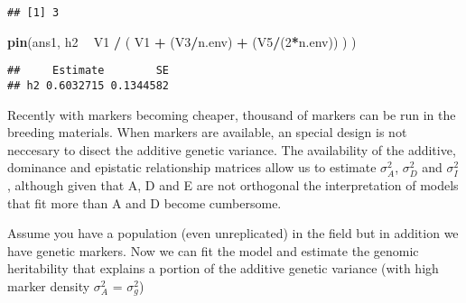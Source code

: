 \documentclass[]{article}
\newenvironment{Shaded}{\begin{snugshade}}{\end{snugshade}}
\newcommand{\KeywordTok}[1]{\textcolor[rgb]{0.13,0.29,0.53}{\textbf{#1}}}
\newcommand{\DataTypeTok}[1]{\textcolor[rgb]{0.13,0.29,0.53}{#1}}
\newcommand{\DecValTok}[1]{\textcolor[rgb]{0.00,0.00,0.81}{#1}}
\newcommand{\StringTok}[1]{\textcolor[rgb]{0.31,0.60,0.02}{#1}}
\newcommand{\CommentTok}[1]{\textcolor[rgb]{0.56,0.35,0.01}{\textit{#1}}}
\newcommand{\OperatorTok}[1]{\textcolor[rgb]{0.81,0.36,0.00}{\textbf{#1}}}
\newcommand{\NormalTok}[1]{#1}
\begin{document}
\begin{verbatim}
## [1] 3
\end{verbatim}

\begin{Shaded}
\begin{Highlighting}[]
\KeywordTok{pin}\NormalTok{(ans1, h2 }\OperatorTok{~}\StringTok{ }\NormalTok{V1 }\OperatorTok{/}\StringTok{ }\NormalTok{( V1 }\OperatorTok{+}\StringTok{ }\NormalTok{(V3}\OperatorTok{/}\NormalTok{n.env) }\OperatorTok{+}\StringTok{ }\NormalTok{(V5}\OperatorTok{/}\NormalTok{(}\DecValTok{2}\OperatorTok{*}\NormalTok{n.env)) ) )}
\end{Highlighting}
\end{Shaded}

\begin{verbatim}
##     Estimate        SE
## h2 0.6032715 0.1344582
\end{verbatim}

Recently with markers becoming cheaper, thousand of markers can be run
in the breeding materials. When markers are available, an special design
is not neccesary to disect the additive genetic variance. The
availability of the additive, dominance and epistatic relationship
matrices allow us to estimate \(\sigma^2_A\), \(\sigma^2_D\) and
\(\sigma^2_I\), although given that A, D and E are not orthogonal the
interpretation of models that fit more than A and D become cumbersome.

Assume you have a population (even unreplicated) in the field but in
addition we have genetic markers. Now we can fit the model and estimate
the genomic heritability that explains a portion of the additive genetic
variance (with high marker density \(\sigma^2_A\) = \(\sigma^2_g\))

\begin{Shaded}
\end{Shaded}
\end{document}
